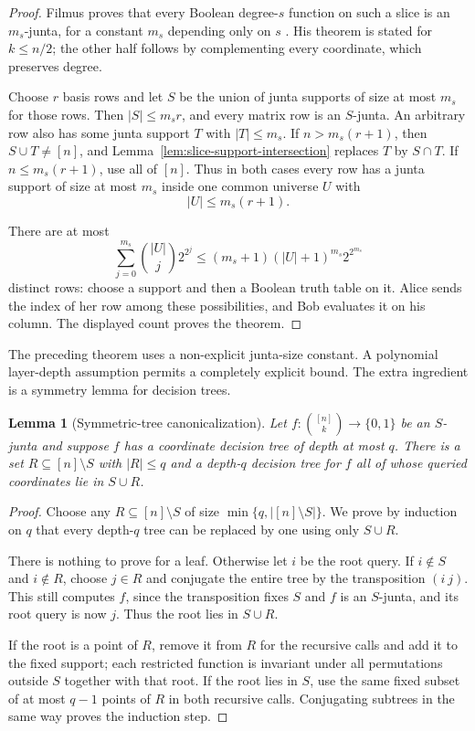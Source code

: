 \documentclass[11pt]{article}
\newtheorem{lemma}[theorem]{Lemma}
\theoremstyle{definition}
\theoremstyle{remark}
\newcommand{\1}{\mathbf 1}
\begin{document}
\begin{proof}
Filmus proves that every Boolean degree-$s$ function on such a slice is an
$m_s$-junta, for a constant $m_s$ depending only on $s$
\cite{FilmusJuntaThreshold}.  His theorem is stated for $k\le n/2$; the
other half follows by complementing every coordinate, which preserves
degree.

Choose $r$ basis rows and let $S$ be the union of junta supports of size at
most $m_s$ for those rows.  Then $|S|\le m_sr$, and every matrix row is an
$S$-junta.  An arbitrary row also has some junta support $T$ with
$|T|\le m_s$.  If $n>m_s(r+1)$, then $S\cup T\ne[n]$, and
Lemma~\ref{lem:slice-support-intersection} replaces $T$ by $S\cap T$.
If $n\le m_s(r+1)$, use all of $[n]$.  Thus in both cases every row has a
junta support of size at most $m_s$ inside one common universe $U$ with
\[
 |U|\le m_s(r+1).
\]

There are at most
\[
 \sum_{j=0}^{m_s}\binom{|U|}{j}2^{2^j}
 \le (m_s+1)(|U|+1)^{m_s}2^{2^{m_s}}
\]
distinct rows: choose a support and then a Boolean truth table on it.  Alice
sends the index of her row among these possibilities, and Bob evaluates it
on his column.  The displayed count proves the theorem.
\end{proof}

The preceding theorem uses a non-explicit junta-size constant.  A polynomial
layer-depth assumption permits a completely explicit bound.  The extra
ingredient is a symmetry lemma for decision trees.

\begin{lemma}[Symmetric-tree canonicalization]
\label{lem:symmetric-tree}
Let $f:\binom{[n]}k\to\{0,1\}$ be an $S$-junta and suppose $f$ has a
coordinate decision tree of depth at most $q$.  There is a set
$R\subseteq[n]\setminus S$ with $|R|\le q$ and a depth-$q$ decision tree for
$f$ all of whose queried coordinates lie in $S\cup R$.
\end{lemma}

\begin{proof}
Choose any $R\subseteq[n]\setminus S$ of size
$\min\{q,|[n]\setminus S|\}$.  We prove by induction on $q$ that every
depth-$q$ tree can be replaced by one using only $S\cup R$.

There is nothing to prove for a leaf.  Otherwise let $i$ be the root query.
If $i\notin S$ and $i\notin R$, choose $j\in R$ and conjugate the entire tree
by the transposition $(i\ j)$.  This still computes $f$, since the
transposition fixes $S$ and $f$ is an $S$-junta, and its root query is now
$j$.  Thus the root lies in $S\cup R$.

If the root is a point of $R$, remove it from $R$ for the recursive calls and
add it to the fixed support; each restricted function is invariant under all
permutations outside $S$ together with that root.  If the root lies in $S$,
use the same fixed subset of at most $q-1$ points of $R$ in both recursive
calls.  Conjugating subtrees in the same way proves the induction step.
\end{proof}
\end{document}
